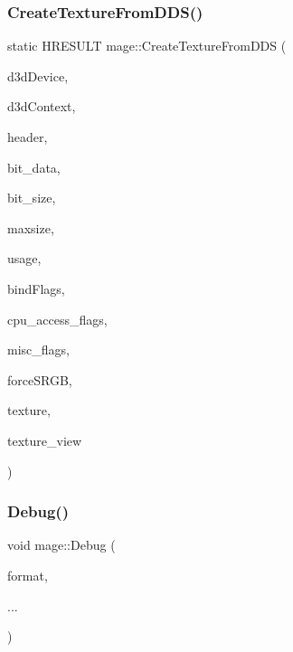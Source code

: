 \subsubsection{\texorpdfstring{Create\+Texture\+From\+D\+D\+S()}{CreateTextureFromDDS()}}
{\footnotesize\ttfamily static H\+R\+E\+S\+U\+LT mage\+::\+Create\+Texture\+From\+D\+DS (\begin{DoxyParamCaption}\item[{\+\_\+\+In\+\_\+ I\+D3\+D11\+Device $\ast$}]{d3d\+Device,  }\item[{\+\_\+\+In\+\_\+opt\+\_\+ I\+D3\+D11\+Device\+Context $\ast$}]{d3d\+Context,  }\item[{\+\_\+\+In\+\_\+ const \hyperlink{structmage_1_1_d_d_s___h_e_a_d_e_r}{D\+D\+S\+\_\+\+H\+E\+A\+D\+ER} $\ast$}]{header,  }\item[{\+\_\+\+In\+\_\+reads\+\_\+bytes\+\_\+(bit\+\_\+size) const uint8\+\_\+t $\ast$}]{bit\+\_\+data,  }\item[{\+\_\+\+In\+\_\+ size\+\_\+t}]{bit\+\_\+size,  }\item[{\+\_\+\+In\+\_\+ size\+\_\+t}]{maxsize,  }\item[{\+\_\+\+In\+\_\+ D3\+D11\+\_\+\+U\+S\+A\+GE}]{usage,  }\item[{\+\_\+\+In\+\_\+ uint32\+\_\+t}]{bind\+Flags,  }\item[{\+\_\+\+In\+\_\+ uint32\+\_\+t}]{cpu\+\_\+access\+\_\+flags,  }\item[{\+\_\+\+In\+\_\+ uint32\+\_\+t}]{misc\+\_\+flags,  }\item[{\+\_\+\+In\+\_\+ bool}]{force\+S\+R\+GB,  }\item[{\+\_\+\+Outptr\+\_\+opt\+\_\+ I\+D3\+D11\+Resource $\ast$$\ast$}]{texture,  }\item[{\+\_\+\+Outptr\+\_\+opt\+\_\+ I\+D3\+D11\+Shader\+Resource\+View $\ast$$\ast$}]{texture\+\_\+view }\end{DoxyParamCaption})\hspace{0.3cm}{\ttfamily [static]}}

\hypertarget{namespacemage_a1bcf1f0301e170105908eee5b5c46830}{}\label{namespacemage_a1bcf1f0301e170105908eee5b5c46830} 
\subsubsection{\texorpdfstring{Debug()}{Debug()}}
{\footnotesize\ttfamily void mage\+::\+Debug (\begin{DoxyParamCaption}\item[{const char $\ast$}]{format,  }\item[{}]{... }\end{DoxyParamCaption})}

